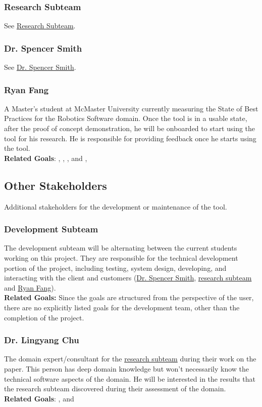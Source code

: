 \documentclass[12pt]{article}
\begin{document}
\subsubsection{Research Subteam}
See \hyperref[research_team]{Research Subteam}.
\subsubsection{Dr. Spencer Smith}
See \hyperref[smith]{Dr. Spencer Smith}.
\subsubsection{Ryan Fang}\label{ryan}
A Master's student at McMaster University currently measuring the State of Best Practices for the Robotics Software domain.
Once the tool is in a usable state, after the proof of concept demonstration, he will be onboarded to start using the tool for his research. He is responsible for providing feedback once he starts using the tool. \\
\textbf{Related Goals}: , , , and ,

\subsection{Other Stakeholders}
Additional stakeholders for the development or maintenance of the tool.
\subsubsection{Development Subteam}
The development subteam will be alternating between the current students working on this project.
They are responsible for the technical development portion of the project, including testing, system design, developing, and interacting with the client and customers (\hyperref[smith]{Dr. Spencer Smith}, \hyperref[research_team]{research subteam} and \hyperref[ryan]{Ryan Fang}).\\
\textbf{Related Goals:} Since the goals are structured from the perspective of the user, there are no explicitly listed goals for the development team, other than the completion of the project.
\subsubsection{Dr. Lingyang Chu}\label{chu}
The domain expert/consultant for the \hyperref[research_team]{research subteam} during their work on the paper. This person has deep domain knowledge but won't necessarily know the technical software aspects of the domain. He will be interested in the results that the research subteam discovered during their assessment of the domain.\\
\textbf{Related Goals}: ,  and 
\end{document}
